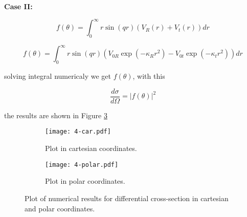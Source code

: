 \documentclass{article}
\begin{document}
\textbf{Case II:}

\begin{equation}
    f(\theta) = \int_0^{\infty} r\sin{(qr)}(V_R(r) + V_t(r))dr
\end{equation}

\begin{equation}
    f(\theta) = \int_0^{\infty} r\sin{(qr)}\left(V_{0R} \exp(-\kappa_R r^2) - V_{0t} \exp(-\kappa_t r^2)\right)dr
\end{equation}

solving integral numericaly we get $f(\theta)$, with this

\begin{equation}
    \frac{d\sigma}{d\Omega} = |f(\theta)|^2
\end{equation}

the results are shown in Figure \ref{4}

\begin{figure}[!h]
    \centering
    \begin{subfigure}[b]{0.7\textwidth}
        \centering
        \texttt{[image: 4-car.pdf]}
        \caption{Plot in cartesian coordinates.}
        \label{fig:first}
    \end{subfigure}
    
    \vspace{1cm}
    
    \begin{subfigure}[b]{0.7\textwidth}
        \centering
        \texttt{[image: 4-polar.pdf]}
        \caption{Plot in polar coordinates.}
        \label{fig:second}
    \end{subfigure}
    
    \caption{Plot of numerical results for differential cross-section in cartesian and polar coordinates.}
    \label{4}
\end{figure}
\end{document}
